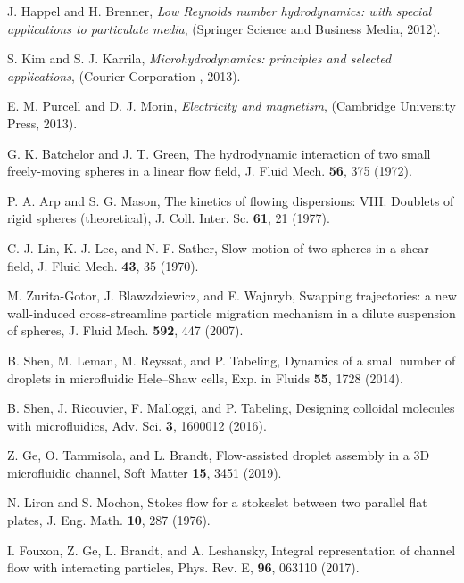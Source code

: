 \iffalse


\begin{thebibliography}{99}

 J. Happel and  H. Brenner, {\it Low Reynolds number hydrodynamics: with special applications to particulate media}, (Springer Science and Business Media, 2012).

 S. Kim and S. J. Karrila, {\it Microhydrodynamics: principles and selected applications}, (Courier Corporation , 2013).

  E. M. Purcell and D. J. Morin, {\it Electricity and magnetism}, (Cambridge University Press, 2013).

 G. K. Batchelor and J. T. Green, The hydrodynamic interaction of two small freely-moving spheres in a linear flow field, J. Fluid Mech. \textbf{56}, 375 (1972).

 P. A. Arp and S. G. Mason, The kinetics of flowing dispersions: VIII. Doublets of rigid spheres (theoretical), J. Coll. Inter. Sc. \textbf{61}, 21 (1977).

  C. J. Lin, K. J. Lee, and N. F. Sather, Slow motion of two spheres in a shear field, J. Fluid Mech. \textbf{43}, 35 (1970).

 M. Zurita-Gotor, J. Blawzdziewicz, and E. Wajnryb, Swapping trajectories: a new wall-induced cross-streamline particle migration mechanism
in a dilute suspension of spheres, J. Fluid Mech. \textbf{592}, 447 (2007).

  B. Shen, M. Leman, M. Reyssat, and P. Tabeling, Dynamics of a small number of droplets in microfluidic Hele–Shaw cells, Exp. in Fluids \textbf{55}, 1728 (2014).

 B. Shen, J. Ricouvier, F. Malloggi, and P. Tabeling, Designing colloidal molecules with microfluidics, Adv. Sci. \textbf{3}, 1600012 (2016).

  Z. Ge, O. Tammisola, and L. Brandt, Flow-assisted droplet assembly in a 3D microfluidic channel, Soft Matter \textbf{15}, 3451 (2019).

 N. Liron and S. Mochon, Stokes flow for a stokeslet between two parallel flat plates, J. Eng. Math. \textbf{10}, 287 (1976).

 I. Fouxon, Z. Ge, L. Brandt, and A. Leshansky, Integral representation of channel flow with interacting particles, Phys. Rev. E, \textbf{96}, 063110 (2017).


\end{thebibliography}
